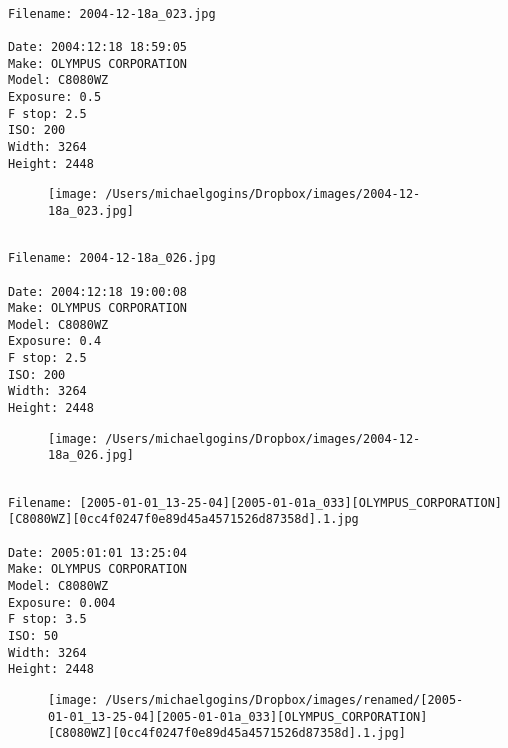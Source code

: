 \clearpage
\onecolumn
\noindent 
\noindent
\begin{lstlisting}

Filename: 2004-12-18a_023.jpg

Date: 2004:12:18 18:59:05
Make: OLYMPUS CORPORATION
Model: C8080WZ
Exposure: 0.5
F stop: 2.5
ISO: 200
Width: 3264
Height: 2448
\end{lstlisting}
\clearpage

\begin{figure}
\texttt{[image: /Users/michaelgogins/Dropbox/images/2004-12-18a\_023.jpg]}
\end{figure}
    
\clearpage
\onecolumn
\noindent 
\noindent
\begin{lstlisting}

Filename: 2004-12-18a_026.jpg

Date: 2004:12:18 19:00:08
Make: OLYMPUS CORPORATION
Model: C8080WZ
Exposure: 0.4
F stop: 2.5
ISO: 200
Width: 3264
Height: 2448
\end{lstlisting}
\clearpage

\begin{figure}
\texttt{[image: /Users/michaelgogins/Dropbox/images/2004-12-18a\_026.jpg]}
\end{figure}
    
\clearpage
\onecolumn
\noindent 
\noindent
\begin{lstlisting}

Filename: [2005-01-01_13-25-04][2005-01-01a_033][OLYMPUS_CORPORATION][C8080WZ][0cc4f0247f0e89d45a4571526d87358d].1.jpg

Date: 2005:01:01 13:25:04
Make: OLYMPUS CORPORATION
Model: C8080WZ
Exposure: 0.004
F stop: 3.5
ISO: 50
Width: 3264
Height: 2448
\end{lstlisting}
\clearpage

\begin{figure}
\texttt{[image: /Users/michaelgogins/Dropbox/images/renamed/[2005-01-01\_13-25-04][2005-01-01a\_033][OLYMPUS\_CORPORATION][C8080WZ][0cc4f0247f0e89d45a4571526d87358d].1.jpg]}
\end{figure}
    

